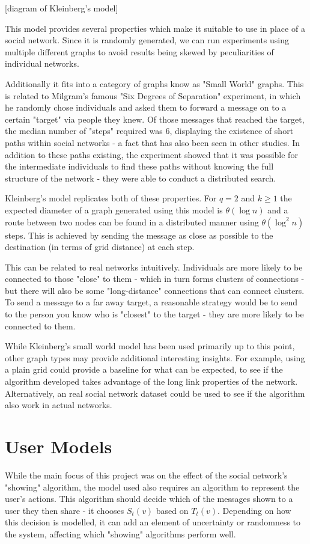 \documentclass[bsc,frontabs,twoside,singlespacing,parskip,deptreport]{infthesis}     %
\begin{document}
[diagram of Kleinberg's model]

This model provides several properties which make it suitable to use in place of a social network. Since it is randomly generated, we can run experiments using multiple different graphs to avoid results being skewed by peculiarities of individual networks. 

Additionally it fits into a category of graphs know as "Small World" graphs. This is related to Milgram's famous "Six Degrees of Separation" experiment\cite{Milgram67,TraversMilgram69}, in which he randomly chose individuals and asked them to forward a message on to a certain "target" via people they knew. Of those messages that reached the target, the median number of "steps" required was 6, displaying the existence of short paths within social networks - a fact that has also been seen in other studies\cite{MilgramBackup1,MilgramBackup2}. In addition to these paths existing, the experiment showed that it was possible for the intermediate individuals to find these paths without knowing the full structure of the network - they were able to conduct a distributed search. 

Kleinberg's model replicates both of these properties. For $q = 2$ and $k \ge 1$ the expected diameter of a graph generated using this model is $\theta (\log n)$ and a route between two nodes can be found in a distributed manner using $\theta (\log^{2}n)$ steps\cite{AnalyzingKleinberg}. This is achieved by sending the message as close as possible to the destination (in terms of grid distance) at each step.

This can be related to real networks intuitively. Individuals are more likely to be connected to those "close" to them - which in turn forms clusters of connections - but there will also be some "long-distance" connections that can connect clusters. To send a message to a far away target, a reasonable strategy would be to send to the person you know who is "closest" to the target - they are more likely to be connected to them.

While Kleinberg's small world model has been used primarily up to this point, other graph types may provide additional interesting insights. For example, using a plain grid could provide a baseline for what can be expected, to see if the algorithm developed takes advantage of the long link properties of the network. Alternatively, an real social network dataset could be used to see if the algorithm also work in actual networks.

\section{User Models}
While the main focus of this project was on the effect of the social network's "showing" algorithm, the model used also requires an algorithm to represent the user's actions. This algorithm should decide which of the messages shown to a user they then share - it chooses $S_{t}(v)$ based on $T_{t}(v)$. Depending on how this decision is modelled, it can add an element of uncertainty or randomness to the system, affecting which "showing" algorithms perform well.
\end{document}
